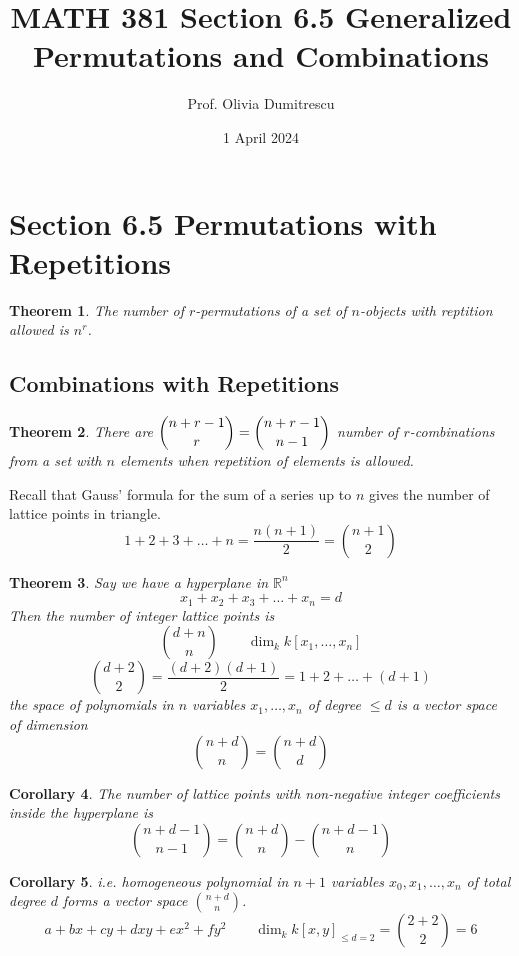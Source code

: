 \documentclass[letterpaper, 12pt]{article}
\title{MATH 381 Section 6.5 Generalized Permutations and Combinations}
\author{Prof. Olivia Dumitrescu}
\date{1 April 2024}
\newtheorem{theorem}{Theorem}[section]
\newtheorem{corollary}[theorem]{Corollary}
\newenvironment{remark}[1][Remark]{\begin{trivlist}
\item[\hskip \labelsep {\bfseries #1}]}{\end{trivlist}}
\newcommand{\R}{\mathbb{R}}
\newcommand{\0}{\emptyset}
\begin{document}
    \maketitle
    \section*{Section 6.5 Permutations with Repetitions}
    \begin{theorem}
        The number of $r$-permutations of a set of $n$-objects with reptition allowed is $n^r$.
    \end{theorem}
    \subsection*{Combinations with Repetitions}
    \begin{theorem}
        There are $\dbinom{n+r-1}{r} = \dbinom{n+r-1}{n-1}$ number of $r$-combinations from a 
        set with $n$ elements when repetition of elements is allowed.
    \end{theorem}
    \begin{remark}
        Recall that Gauss' formula for the sum of a series up to $n$ gives the number of 
        lattice points in triangle.
        \[1+2+3+\dots+n = \frac{n(n+1)}{2} = \binom{n+1}{2}\]
    \end{remark}
    \begin{theorem}
        Say we have a hyperplane in $\R^n$
        \[x_1 + x_2 + x_3 + \dots + x_n = d\]
        Then the number of integer lattice points is 
        \[\binom{d+n}{n} \qquad \dim_k k[x_1,\dots,x_n]\]
        \[\binom{d+2}{2} = \frac{(d+2)(d+1)}{2} = 1 + 2 + \dots + (d+1)\]
        the space of polynomials in $n$ variables $x_1,\dots,x_n$ of degree $\le d$ is a vector 
        space of dimension
        \[\binom{n+d}{n} = \binom{n+d}{d}\]
    \end{theorem}
    \begin{corollary}
        The number of lattice points with non-negative integer coefficients inside the hyperplane is 
        \[\binom{n+d-1}{n-1} = \binom{n+d}{n} - \binom{n+d-1}{n}\]
    \end{corollary}
    \begin{corollary}
        i.e. homogeneous polynomial in $n+1$ variables $x_0,x_1,\dots,x_n$ of total degree $d$ 
        forms a vector space $\binom{n+d}{n}$.
        \[a + bx + cy + dxy + ex^2 + fy^2 \qquad \dim_k k[x, y]_{\le d=2} = \binom{2+2}{2} = 6\]
    \end{corollary}
\end{document}
